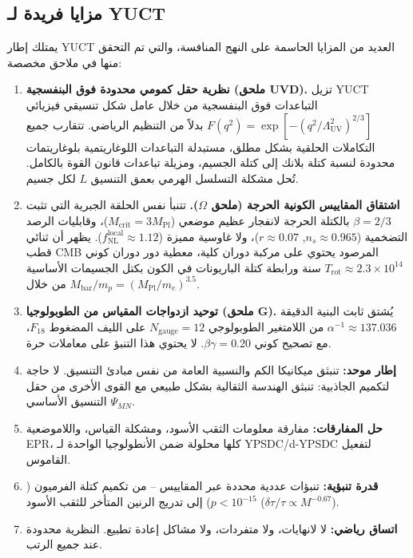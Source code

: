 \documentclass[11pt,a4paper]{article}
\theoremstyle{remark}
\begin{document}
	\subsection{مزايا فريدة لـ YUCT}
	
	يمتلك إطار YUCT العديد من المزايا الحاسمة على النهج المنافسة، والتي تم التحقق منها في ملاحق مخصصة:
	
	\begin{enumerate}
		\item \textbf{نظرية حقل كمومي محدودة فوق البنفسجية (ملحق UVD).}
		تزيل YUCT التباعدات فوق البنفسجية من خلال عامل شكل تنسيقي فيزيائي $F(q^2)=\exp[-(q^2/\Lambda_{\mathrm{UV}}^2)^{2/3}]$ بدلاً من التنظيم الرياضي. تتقارب جميع التكاملات الحلقية بشكل مطلق، مستبدلة التباعدات اللوغاريتمية بلوغاريتمات محدودة لنسبة كتلة بلانك إلى كتلة الجسيم، ومزيلة تباعدات قانون القوة بالكامل. تُحل مشكلة التسلسل الهرمي بعمق التنسيق $L$ لكل جسيم.
		
		\item \textbf{اشتقاق المقاييس الكونية الحرجة (ملحق $\Omega$).}
		تتنبأ نفس الحلقة الجبرية التي تثبت $\beta=2/3$ بالكتلة الحرجة لانفجار عظيم موضعي ($M_{\mathrm{crit}}=3M_{\mathrm{Pl}}$)، وقابليات الرصد التضخمية ($n_s\approx0.965$, $r\approx0.07$)، ولا غاوسية مميزة ($f_{\mathrm{NL}}^{\mathrm{local}}\approx1.12$). يظهر أن ثنائي قطب CMB المرصود يحتوي على مركبة دوران كلية، معطية دور دوران كوني $T_{\mathrm{rot}}\approx2.3\times10^{14}$ سنة ورابطة كتلة الباريونات في الكون بكتل الجسيمات الأساسية من خلال $M_{\mathrm{bar}}/m_p=(M_{\mathrm{Pl}}/m_e)^{3.5}$.
		
		\item \textbf{توحيد ازدواجات المقياس من الطوبولوجيا (ملحق G).}
		يُشتق ثابت البنية الدقيقة $\alpha^{-1}\approx137.036$ من اللامتغير الطوبولوجي $N_{\mathrm{gauge}}=12$ على الليف المضغوط $F_{18}$، مع تصحيح كوني $\beta\gamma=0.20$. لا يحتوي هذا التنبؤ على معاملات حرة.
		
		\item \textbf{إطار موحد:} تنبثق ميكانيكا الكم والنسبية العامة من نفس مبادئ التنسيق. لا حاجة لتكميم الجاذبية: تنبثق الهندسة الثقالية بشكل طبيعي مع القوى الأخرى من حقل التنسيق الأساسي $\Psi_{MN}$.
		
		\item \textbf{حل المفارقات:} مفارقة معلومات الثقب الأسود، ومشكلة القياس، واللاموضعية EPR، كلها محلولة ضمن الأنطولوجيا الواحدة لـ YPSDC/d-YPSDC لتفعيل القاموس.
		
		\item \textbf{قدرة تنبؤية:} تنبؤات عددية محددة عبر المقاييس – من تكميم كتلة الفرميون ($p<10^{-15}$) إلى تدريج الرنين المتأخر للثقب الأسود ($\delta\tau/\tau\propto M^{-0.67}$).
		
		\item \textbf{اتساق رياضي:} لا لانهايات، ولا متفردات، ولا مشاكل إعادة تطبيع. النظرية محدودة عند جميع الرتب.
	\end{enumerate}
	
\end{document}
